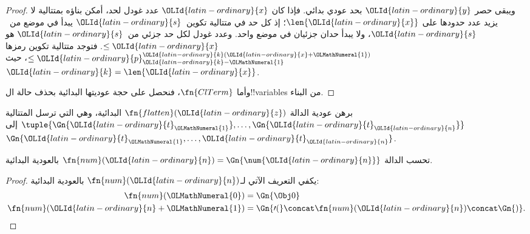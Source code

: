 \documentclass[../../../include/open-logic-section]{subfiles}
\begin{document}
\begin{proof}
ويبقى حصر ${\OLId{latin-ordinary}{y}}$ بحد عودي بدائي. فإذا كان
${\OLId{latin-ordinary}{x}}$ عدد غودل لحد، أمكن بناؤه بمتتالية
لا يزيد عدد حدودها على $\len{{\OLId{latin-ordinary}{x}}}$؛
إذ كل حد في متتالية تكوين~${\OLId{latin-ordinary}{s}}$ يبدأ
في موضع من~${\OLId{latin-ordinary}{s}}$، ولا يبدأ حدان جزئيان
في موضع واحد. وعدد غودل لكل حد جزئي
من~${\OLId{latin-ordinary}{s}}$ هو $ \le {\OLId{latin-ordinary}{x}}$. فتوجد متتالية
تكوين رمزها $\le {\OLId{latin-ordinary}{p}}_{{\OLId{latin-ordinary}{k}}-{\OLMathNumeral{1}}}^{{\OLId{latin-ordinary}{k}}({\OLId{latin-ordinary}{x}}+{\OLMathNumeral{1}})}$،
حيث ${\OLId{latin-ordinary}{k}}=\len{{\OLId{latin-ordinary}{x}}}$.

وأما $\fn{ClTerm}$، فنحصل على حجة عوديتها
البدائية بحذف حالة ال!!{variable}s من البناء.
\end{proof}

\begin{prob}
برهن عودية الدالة $\fn{flatten}({\OLId{latin-ordinary}{z}})$ البدائية، وهي التي ترسل المتتالية
$\tuple{\Gn{{\OLId{latin-ordinary}{t}}_{\OLMathNumeral{1}}}, \dots, \Gn{{\OLId{latin-ordinary}{t}}_{\OLId{latin-ordinary}{n}}}}$ إلى $\Gn{{\OLId{latin-ordinary}{t}}_{\OLMathNumeral{1}}, \dots, {\OLId{latin-ordinary}{t}}_{\OLId{latin-ordinary}{n}}}$.
\end{prob}

\begin{prop}
  تحسب الدالة $\fn{num}({\OLId{latin-ordinary}{n}})=\Gn{\num{{\OLId{latin-ordinary}{n}}}}$ بالعودية البدائية.
\end{prop}

\begin{proof}
  يكفي التعريف الآتي لـ$\fn{num}({\OLId{latin-ordinary}{n}})$ بالعودية البدائية:
  \begin{align*}
    \fn{num}({\OLMathNumeral{0}}) & = \Gn{\Obj 0}\\
    \fn{num}({\OLId{latin-ordinary}{n}}+{\OLMathNumeral{1}}) & = \Gn{\prime(} \concat \fn{num}({\OLId{latin-ordinary}{n}}) \concat \Gn{)}.
  \end{align*}
\end{proof}
\end{document}
